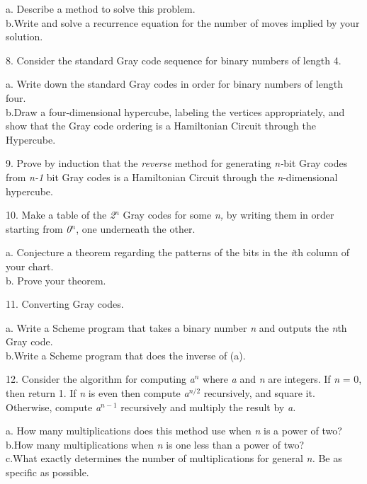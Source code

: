\documentclass{article}
\newcommand{\tab}{\makebox[4em]{}}
\begin{document}
a.\tab 
Describe a method to solve this problem.\\
b.\tab Write and solve a recurrence equation for the number of moves 
implied by your solution.


8.\tab 
Consider the standard Gray code sequence for binary numbers of 
length 4.


a.\tab 
Write down the standard Gray codes in order for binary numbers 
of length four.\\
b.\tab Draw a four-dimensional hypercube, labeling the vertices appropriately, 
and show that the Gray code ordering is a Hamiltonian Circuit 
through the Hypercube.


9.\tab 
Prove by induction that the \textit{reverse} method for generating \textit{n-}bit 
Gray codes from \textit{n-1} bit Gray codes is a Hamiltonian Circuit 
through the \textit{n}-dimensional hypercube. 


10.\tab 
 Make a table of the \textit{2}$^{\mathit{n}}$ Gray codes for some \textit{n,} by 
writing them in order starting from \textit{0}$^{\mathit{n}}$, one underneath 
the other. 


a.\tab 
Conjecture a theorem regarding the patterns of the bits in the \textit{i}th 
column of your chart. \\
b.\tab 
Prove your theorem.


11.\tab 
Converting Gray codes.


a.\tab 
Write a Scheme program that takes a binary number \textit{n} and outputs 
the \textit{n}th Gray code.\\
b.\tab Write a Scheme program that does the inverse of (a).


12.\tab 
Consider the algorithm for computing \textit{a}$^{\mathit{n}}$ where \textit{a} and \textit{n} are 
integers. If \textit{n} = 0, then return 1. If \textit{n} is even then compute \textit{a}$^{\mathit{n/2}}$ recursively, 
and square it. Otherwise, compute \textit{a}$^{\mathit{n-1}}$ recursively and 
multiply the result by \textit{a.}


a.\tab 
How many multiplications does this method use when \textit{n} is a 
power of two?\\
b.\tab How many multiplications when \textit{n} is one less than a power 
of two?\\
c.\tab What exactly determines the number of multiplications for general \textit{n.} Be 
as specific as possible.
\end{document}

